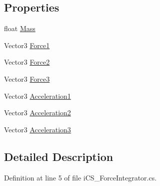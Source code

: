 \subsection*{Properties}
\begin{DoxyCompactItemize}
\item 
float \hyperlink{classi_c_s___force_integrator_a5e7f3a5aedcae2c245670af79966cd8f}{Mass}
\item 
Vector3 \hyperlink{classi_c_s___force_integrator_aef1c160690c3c63598dbf5920e97e21b}{Force1}
\item 
Vector3 \hyperlink{classi_c_s___force_integrator_aa4d529288f969bc8142b07f76f231ebd}{Force2}
\item 
Vector3 \hyperlink{classi_c_s___force_integrator_a1d20f2763147f1f6b4981a4440e6dfa9}{Force3}
\item 
Vector3 \hyperlink{classi_c_s___force_integrator_a3d786a1848075460fbf115ee6ab017f1}{Acceleration1}
\item 
Vector3 \hyperlink{classi_c_s___force_integrator_a43e5c8ee1a0da0b4c5473fdce906c383}{Acceleration2}
\item 
Vector3 \hyperlink{classi_c_s___force_integrator_a811ae6403be08cbf53da477c09b0c2c4}{Acceleration3}
\end{DoxyCompactItemize}


\subsection{Detailed Description}


Definition at line 5 of file i\+C\+S\+\_\+\+Force\+Integrator.\+cs.



